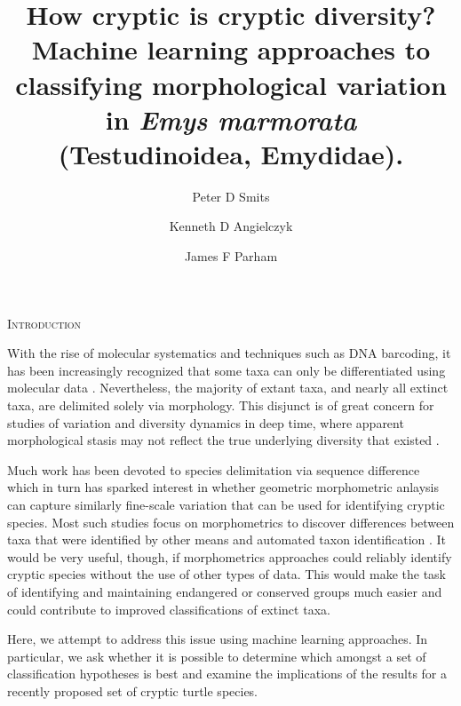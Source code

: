 \documentclass[12pt,letterpaper]{article}
\title{How cryptic is cryptic diversity? Machine learning approaches to classifying morphological variation in \textit{Emys marmorata} (Testudinoidea, Emydidae).}
\author[1]{Peter D Smits}%
\author[1,2]{Kenneth D Angielczyk}%
\author[3]{James F Parham}%
\affil[1]{Committee on Evolutionary Biology, University of Chicago}
\affil[2]{Integrative Research Center, Field Museum of Natural History}
\affil[3]{Department of Geological Sciences, California State University -- Fullerton}
\renewcommand{\section}[1]{%
\bigskip
\begin{center}
\begin{Large}
\normalfont\scshape #1
\medskip
\end{Large}
\end{center}}
\begin{document}
\maketitle
{}

\linenumbers
\modulolinenumbers[2]

\begin{abstract}
\end{abstract}

\section{Introduction}

With the rise of molecular systematics and techniques such as DNA barcoding, it has been increasingly recognized that some taxa can only be differentiated using molecular data \citep{Bickford2007,SchlickSteiner2007,Stuart2006,Pfenninger2007,Funk2012,Clare2011}. Nevertheless, the majority of extant taxa, and nearly all extinct taxa, are delimited solely via morphology. This disjunct is of great concern for studies of variation and diversity dynamics in deep time, where apparent morphological stasis may not reflect the true underlying diversity that existed \citep{Hunt2008,Eldredge1972,Gould1977a,VanBocxlaer2013}. 

Much work has been devoted to species delimitation via sequence difference \citep{Fujita2012,Yang2010b} which in turn has sparked interest in whether geometric morphometric anlaysis can capture similarly fine-scale variation that can be used for identifying cryptic species. Most such studies focus on morphometrics to discover differences between taxa that were identified by other means \citep{Polly2007a,Demandt2009,Gaubert2005b,Gunduz2007,Polly2003,Zelditch2004} and automated taxon identification \citep{MacLeod2007}. It would be very useful, though, if morphometrics approaches could reliably identify cryptic species without the use of other types of data. This would make the task of identifying and maintaining endangered or conserved groups much easier and could contribute to improved classifications of extinct taxa.

Here, we attempt to address this issue using machine learning approaches. In particular, we ask whether it is possible to determine which amongst a set of classification hypotheses is best and examine the implications of the results for a recently proposed set of cryptic turtle species.
\end{document}
